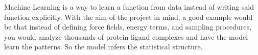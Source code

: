 
Machine Learning is a way to learn a function from data instead of writing said
function explicitly. With the aim of the project in mind, a good example would be
that instead of defining force fields, energy terms, and sampling procedures, you
would analyze thousands of protein-ligand complexes and have the model learn the
patterns. So the model infers the statistical structure.



